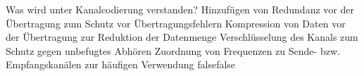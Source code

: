     {Was wird unter Kanalcodierung verstanden?}
    {Hinzufügen von Redundanz vor der Übertragung zum Schutz vor Übertragungsfehlern}
    {Kompression von Daten vor der Übertragung zur Reduktion der Datenmenge}
    {Verschlüsselung des Kanals zum Schutz gegen unbefugtes Abhören}
    {Zuordnung von Frequenzen zu Sende- bzw. Empfangskanälen zur häufigen Verwendung}
    {false}{false}